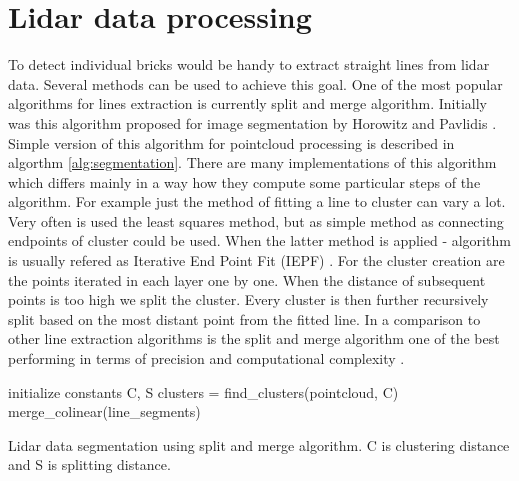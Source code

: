 \section{Lidar data processing}

To detect individual bricks would be handy to extract straight lines from lidar data. Several methods can be used to achieve this goal. One of the most popular algorithms for lines extraction is currently split and merge algorithm. Initially was this algorithm proposed for image segmentation by Horowitz and Pavlidis \cite{horowitz1974}. Simple version of this algorithm for pointcloud processing is described in algorthm \ref{alg:segmentation}. There are many implementations of this algorithm which differs mainly in a way how they compute some particular steps of the algorithm. For example just the method of fitting a line to cluster can vary a lot. Very often is used the least squares method, but as simple method as connecting endpoints of cluster could be used. When the latter method is applied - algorithm is usually refered as Iterative End Point Fit (IEPF) \cite{siadat1997}. For the cluster creation are the points iterated in each layer one by one. When the distance of subsequent points is too high we split the cluster. Every cluster is then further recursively split based on the most distant point from the fitted line. In a comparison to other line extraction algorithms is the split and merge algorithm one of the best performing in terms of precision and computational complexity \cite{nguyen2006}.
\begin{algorithm}[]
initialize constants C, S\;
  clusters = find\_clusters(pointcloud, C)\;
merge\_colinear(line\_segments)\;
 
 \caption{Lidar data segmentation using split and merge algorithm. C is clustering distance and S is splitting distance.}
 \label{alg:segmentation}
\end{algorithm}


